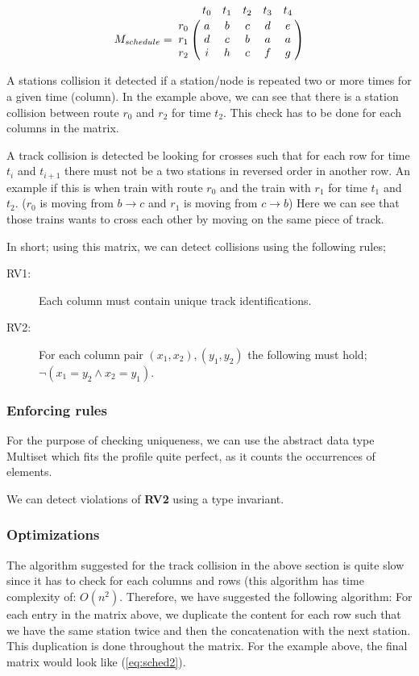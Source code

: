 \documentclass[10pt,a4paper]{article}
\let\bbordermatrix\bordermatrix
\begin{document}
\begin{equation}
M_{schedule} = \bbordermatrix{
                    ~ & t_0 & t_1 & t_2 & t_3 & t_4 \cr
                  r_0 & a   & b   & c   & d   & e\cr
                  r_1 & d   & c   & b   & a   & a\cr
                  r_2 & i   & h   & c   & f   & g}
\label{eq:sched1}
\end{equation}

A stations collision it detected if a station/node is repeated two or more times for a given time (column).
In the example above, we can see that there is a station collision between route $r_0$ and $r_2$ for time $t_2$.
This check has to be done for each columns in the matrix.
 
A track collision is detected be looking for crosses such that for each row for time $t_i$ and $t_{i+1}$ there must not be a two stations in reversed order in another row.
An example if this is when train with route $r_0$ and the train with $r_1$ for time $t_1$ and $t_2$. ($r_0$ is moving from $b \rightarrow c$ and $r_1$ is moving from $ c \rightarrow b $) Here we can see that those trains wants to cross each other by moving on the same piece of track.  

In short; using this matrix, we can detect collisions using the following rules;

\begin{description}
  \item[RV1:] Each column must contain unique track identifications.
  \item[RV2:] For each column pair $\left( x_1,x_2 \right), \left( y_1,y_2 \right)$ the following must hold;\\ $\lnot\left(x_1 = y_2 \land x_2 = y_1\right)$.
\end{description}

\subsubsection{Enforcing rules}
For the purpose of checking uniqueness, we can use the abstract data type Multiset which fits the profile quite perfect, as it counts the occurrences of elements. 

We can detect violations of \textbf{RV2} using a type invariant.
\subsubsection{Optimizations}
 
The algorithm suggested for the track collision in the above section is quite slow since it has to check for each columns and rows (this algorithm has time complexity of: $O(n^2)$.
Therefore, we have suggested the following algorithm:
For each entry in the matrix above, we duplicate the content for each row such that we have the same station twice and then the concatenation with the next station. This duplication is done throughout the matrix. For the example above, the final matrix would look like (\ref{eq:sched2}).
\end{document}
